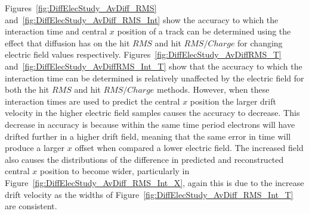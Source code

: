 
Figures~\ref{fig:DiffElecStudy_AvDiff_RMS} and~\ref{fig:DiffElecStudy_AvDiff_RMS_Int} show the accuracy to which the interaction time and central $x$ position of a track can be determined using the effect that diffusion has on the hit $RMS$ and hit $RMS/Charge$ for changing electric field values respectively. Figures~\ref{fig:DiffElecStudy_AvDiffRMS_T} and~\ref{fig:DiffElecStudy_AvDiffRMS_Int_T} show that the accuracy to which the interaction time can be determined is relatively unaffected by the electric field for both the hit $RMS$ and hit $RMS/Charge$ methods. However, when these interaction times are used to predict the central $x$ position the larger drift velocity in the higher electric field samples causes the accuracy to decrease. This decrease in accuracy is because within the same time period electrons will have drifted further in a higher drift field, meaning that the same error in time will produce a larger $x$ offset when compared a lower electric field. The increased field also causes the distributions of the difference in predicted and reconstructed central $x$ position to become wider, particularly in Figure~\ref{fig:DiffElecStudy_AvDiff_RMS_Int_X}, again this is due to the increase drift velocity as the widths of Figure~\ref{fig:DiffElecStudy_AvDiff_RMS_Int_T} are consistent. \\

